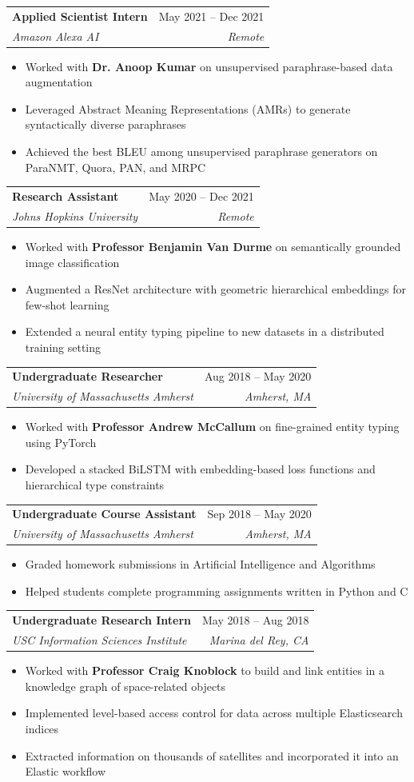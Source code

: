 \documentclass[letterpaper,11pt]{article}
\makeatletter
\newcommand{\resumeItem}[1]{
  \item\small{
    {#1 \vspace{-2pt}}
  }
}
\newcommand{\resumeSubheading}[4]{
  \vspace{-2pt}\item
    \begin{tabular*}{0.97\textwidth}[t]{l@{\extracolsep{\fill}}r}
      \textbf{#1} & #2 \\
      \textit{\small#3} & \textit{\small #4} \\
    \end{tabular*}\vspace{-7pt}
}
\newcommand{\resumeItemListStart}{\begin{itemize}}
\newcommand{\resumeItemListEnd}{\end{itemize}\vspace{-5pt}}
\makeatother
\begin{document}
        \resumeSubheading
            {Applied Scientist Intern}{May 2021 -- Dec 2021}{Amazon Alexa AI}{Remote}
            \resumeItemListStart
                \resumeItem{Worked with \textbf{Dr. Anoop Kumar} on unsupervised paraphrase-based data augmentation}
                \resumeItem{Leveraged Abstract Meaning Representations (AMRs) to generate syntactically diverse paraphrases}
                \resumeItem{Achieved the best BLEU among unsupervised paraphrase generators on ParaNMT, Quora, PAN, and MRPC}
            \resumeItemListEnd

        \resumeSubheading
            {Research Assistant}{May 2020 -- Dec 2021}{Johns Hopkins University}{Remote}
            \resumeItemListStart
                \resumeItem{Worked with \textbf{Professor Benjamin Van Durme} on semantically grounded image classification}
                \resumeItem{Augmented a ResNet architecture with geometric hierarchical embeddings for few-shot learning}
                \resumeItem{Extended a neural entity typing pipeline to new datasets in a distributed training setting}
            \resumeItemListEnd

        \resumeSubheading
            {Undergraduate Researcher}{Aug 2018 -- May 2020}{University of Massachusetts Amherst}{Amherst, MA}
            \resumeItemListStart
                \resumeItem{Worked with \textbf{Professor Andrew McCallum} on fine-grained entity typing using PyTorch}
                \resumeItem{Developed a stacked BiLSTM with embedding-based loss functions and hierarchical type constraints}
            \resumeItemListEnd

        \resumeSubheading
            {Undergraduate Course Assistant}{Sep 2018 -- May 2020}{University of Massachusetts Amherst}{Amherst, MA}
            \resumeItemListStart
                \resumeItem{Graded homework submissions in Artificial Intelligence and Algorithms}
                \resumeItem{Helped students complete programming assignments written in Python and C}
            \resumeItemListEnd

        \resumeSubheading
            {Undergraduate Research Intern}{May 2018 -- Aug 2018}{USC Information Sciences Institute}{Marina del Rey, CA}
            \resumeItemListStart
                \resumeItem{Worked with \textbf{Professor Craig Knoblock} to build and link entities in a knowledge graph of space-related objects}
                \resumeItem{Implemented level-based access control for data across multiple Elasticsearch indices}
                \resumeItem{Extracted information on thousands of satellites and incorporated it into an Elastic workflow}
            \resumeItemListEnd
\end{document}

